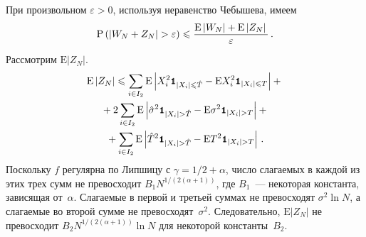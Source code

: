 \begin{multicols}{2}
При произвольном $\varepsilon>0$, используя неравенство Чебышева, имеем
$$
\mbox{P}\left(\left\vert W_N+Z_N\right\vert>\varepsilon\right)\leqslant\displaystyle\frac{\displaystyle \mbox{E}\left\vert W_N\right\vert+
\mbox{E}\left\vert Z_N\right\vert\mathstrut}{\displaystyle \varepsilon\mathstrut}\,.
$$
Рассмотрим $\mbox{E}\left\vert Z_N\right\vert$.
\begin{multline*}
\mbox{E}\left\vert Z_N\right\vert\leqslant\sum_{i\in I_2}\mbox{E}
\left\vert X_i^2\Ik_{|X_i|\leqslant \hat{T}}-\mbox{E}X_i^2\Ik_{|X_i|\leqslant T}\right\vert+{}\\
{}+2\sum_{i\in I_2}\mbox{E}\left\vert\hat{\sigma}^2
\Ik_{|X_i|>\hat{T}}-\mbox{E}\sigma^2\Ik_{|X_i|>T}\right\vert+{}\\
{}+\sum_{i\in I_2}\mbox{E}\left\vert\hat{T}^2\Ik_{|X_i|>\hat{T}}-\mbox{E}T^2\Ik_{|X_i|> T}\right\vert\,.
\end{multline*}
Поскольку $f$ регулярна по Липшицу с $\gamma={1}/{2}+\alpha$, число слагаемых в каждой из этих трех сумм не 
превосходит $B_1 N^{{1}/(2(\alpha+1))}$, где $B_1$~--- некоторая константа, зависящая от~$\alpha$. 
Слагаемые в первой и третьей суммах не превосходят $\sigma^2\ln N$, а слагаемые во второй сумме не превосходят~$\sigma^2$. 
Следовательно, $\mbox{E}|Z_N|$ не превосходит $B_2N^{{1}/(2(\alpha+1))}\ln N$ для некоторой константы~$B_2$.


\end{multicols}
